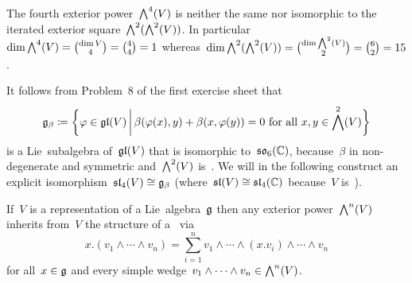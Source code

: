\begin{warning}
  The fourth exterior power~$\exterior[4]{V}$ is neither the same nor isomorphic to the iterated exterior square~$\exterior[2]{\exterior[2]{V}}$.
  In particular~$\dim \exterior[4]{V} = \binom{\dim V}{4} = \binom{4}{4} = 1$ whereas~$\dim \exterior[2]{\exterior[2]{V}} = \binom{\dim \exterior[2]{V}}{2} = \binom{6}{2} = 15$.
\end{warning}

It follows from Problem~8 of the first exercise sheet that
\[
  \glie_\beta
  \defined
  \biggl\{
    \varphi
    \in
    \gllie(V)
    \suchthat[\bigg]
    \text{$\beta(\varphi(x), y) + \beta(x, \varphi(y)) = 0$ for all~$x,y \in \exterior[2]{V}$}
  \biggr\}
\]
is a Lie~subalgebra of~$\mathfrak{gl}(V)$ that is isomorphic to~$\mathfrak{so}_6(\mathbb{C})$, because~$\beta$ in non-degenerate and symmetric and~$\exterior[2]{V}$ is~{\sixdimensional}.
We will in the following construct an explicit isomorphism~$\mathfrak{sl}_4(V) \cong \mathfrak{g}_\beta$ (where~$\mathfrak{sl}(V) \cong \mathfrak{sl}_4(\mathbb{C})$ because~$V$ is~{\fourdimensional}).

\begin{lemma}
  \label{induced exterior action}
  If~$V$ is a representation of a Lie~algebra~$\glie$ then any exterior power~$\exterior[n]{V}$ inherits from~$V$ the structure of a~{\representation{$\glie$}} via
  \[
    x.(v_1 \wedge \dotsb \wedge v_n)
    =
    \sum_{i=1}^n v_1 \wedge \dotsb \wedge (x.v_i) \wedge \dotsb \wedge v_n
  \]
  for all~$x \in \mathfrak{g}$ and every simple wedge~$v_1 \wedge \dotsb \wedge v_n \in \exterior[n]{V}$.
\end{lemma}

